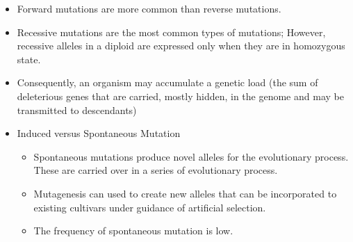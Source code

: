 \documentclass[11pt,ignorenonframetext,aspectratio=169]{beamer}
\providecommand{\tightlist}{%
  \setlength{\itemsep}{0pt}\setlength{\parskip}{0pt}}
\begin{document}
\begin{frame}{}
\protect\hypertarget{section-1}{}
\begin{itemize}
\item
  Forward mutations are more common than reverse mutations.
\item
  Recessive mutations are the most common types of mutations; However,
  recessive alleles in a diploid are expressed only when they are in
  homozygous state.
\item
  Consequently, an organism may accumulate a genetic load (the sum of
  deleterious genes that are carried, mostly hidden, in the genome and
  may be transmitted to descendants)
\item
  Induced versus Spontaneous Mutation

  \begin{itemize}
  \tightlist
  \item
    Spontaneous mutations produce novel alleles for the evolutionary
    process. These are carried over in a series of evolutionary process.
  \item
    Mutagenesis can used to create new alleles that can be incorporated
    to existing cultivars under guidance of artificial selection.
  \item
    The frequency of spontaneous mutation is low.
  \end{itemize}
\end{itemize}
\end{frame}
\end{document}
